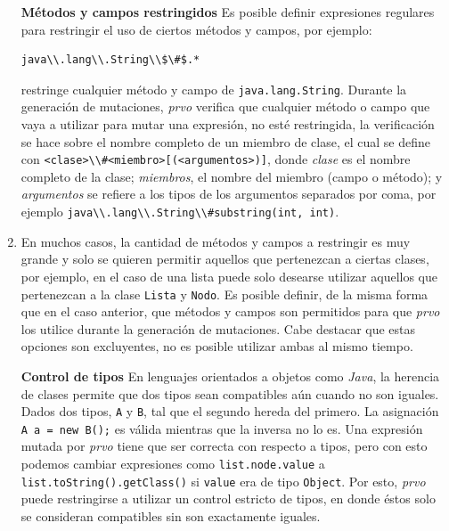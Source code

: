 \begin{enumerate}[leftmargin=.75cm,align=left]
	\item[\textbf{M\'etodos y campos restringidos}] Es posible definir expresiones regulares para restringir el uso de ciertos m\'etodos y campos, por ejemplo:
	\begin{lstlisting}[mathescape=true]
	java\\.lang\\.String\\$\#$.*
	\end{lstlisting}
	restringe cualquier m\'etodo y campo de \lstinline{java.lang.String}. Durante la generaci\'on de mutaciones, \emph{prvo} verifica que cualquier m\'etodo o campo que vaya a utilizar para mutar una expresi\'on, no est\'e restringida, la verificaci\'on se hace sobre el nombre completo de un miembro de clase, el cual se define con \lstinline{<clase>\\#<miembro>[(<argumentos>)]}, donde \emph{clase} es el nombre completo de la clase; \emph{miembros}, el nombre del miembro (campo o método); y \emph{argumentos} se refiere a los tipos de los argumentos separados por coma, por ejemplo \lstinline{java\\.lang\\.String\\#substring(int, int)}.
	
	\item[\textbf{M\'etodos y campos permitidos}] En muchos casos, la cantidad de m\'etodos y campos a restringir es muy grande y solo se quieren permitir aquellos que pertenezcan a ciertas clases, por ejemplo, en el caso de una lista puede solo desearse utilizar aquellos que pertenezcan a la clase \lstinline{Lista} y \lstinline{Nodo}. Es posible definir, de la misma forma que en el caso anterior, que m\'etodos y campos son permitidos para que \emph{prvo} los utilice durante la generaci\'on de mutaciones. Cabe destacar que estas opciones son excluyentes, no es posible utilizar ambas al mismo tiempo.
	
	\item[\textbf{Control de tipos}] En lenguajes orientados a objetos como \emph{Java}, la herencia de clases permite que dos tipos sean compatibles a\'un cuando no son iguales. Dados dos tipos, \texttt{A} y \texttt{B}, tal que el segundo hereda del primero. La asignaci\'on \lstinline|A a = new B();| es v\'alida mientras que la inversa no lo es. Una expresi\'on mutada por \emph{prvo} tiene que ser correcta con respecto a tipos, pero con esto podemos cambiar expresiones como \lstinline|list.node.value| a \lstinline|list.toString().getClass()| si \texttt{value} era de tipo \texttt{Object}. Por esto, \emph{prvo} puede restringirse a utilizar un control estricto de tipos, en donde \'estos solo se consideran compatibles sin son exactamente iguales.
	

\end{enumerate}
